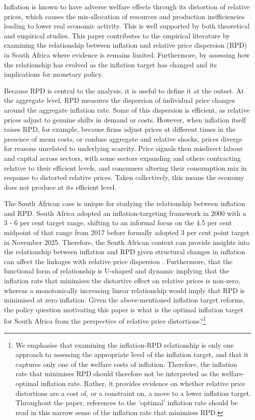 \documentclass[
  letterpaper,
  DIV=11,
  numbers=noendperiod]{scrartcl}
\begin{document}
Inflation is known to have adverse welfare effects through its
distortion of relative prices, which causes the mis-allocation of
resources and production inefficiencies leading to lower real economic
activity. This is well supported by both theoretical and empirical
studies. This paper contributes to the empirical literature by examining
the relationship between inflation and relative price dispersion (RPD)
in South Africa where evidence is remains limited. Furthermore, by
assessing how the relationship has evolved as the inflation target has
changed and its implications for monetary policy.

Because RPD is central to the analysis, it is useful to define it at the
outset. At the aggregate level, RPD measures the dispersion of
individual price changes around the aggregate inflation rate. Some of
this dispersion is efficient, as relative prices adjust to genuine
shifts in demand or costs. However, when inflation itself raises RPD,
for example, because firms adjust prices at different times in the
presence of menu costs, or confuse aggregate and relative shocks, prices
diverge for reasons unrelated to underlying scarcity. Price signals then
misdirect labour and capital across sectors, with some sectors expanding
and others contracting relative to their efficient levels, and consumers
altering their consumption mix in response to distorted relative prices.
Taken collectively, this means the economy does not produce at its
efficient level.

The South African case is unique for studying the relationship between
inflation and RPD. South Africa adopted an inflation-targeting framework
in 2000 with a 3 - 6 per cent target range, shifting to an informal
focus on the 4.5 per cent midpoint of that range from 2017 before
formally adopted 3 per cent point target in November 2025. Therefore,
the South African context can provide insights into the relationship
between inflation and RPD given structural changes in inflation can
affect the linkages with relative price dispersion \citep{caglayan2003}.
Furthermore, that the functional form of relationship is U-shaped and
dynamic \citep{fielding2000, choi2010} implying that the inflation rate
that minimises the distortive effect on relative prices is non-zero,
whereas a monotonically increasing linear relationship would imply that
RPD is minimised at zero inflation. Given the above-mentioned inflation
target reforms, the policy question motivating this paper is what is the
optimal inflation target for South Africa from the perspective of
relative price distortions?\footnote{We emphasise that examining the
  inflation-RPD relationship is only one approach to assessing the
  appropriate level of the inflation target, and that it captures only
  one of the welfare costs of inflation. Therefore, the inflation rate
  that minimises RPD should therefore not be interpreted as the
  welfare-optimal inflation rate. Rather, it provides evidence on
  whether relative price distortions are a cost of, or a constraint on,
  a move to a lower inflation target. Throughout the paper, references
  to the `optimal' inflation rate should be read in this narrow sense of
  the inflation rate that minimises RPD.}
\end{document}
